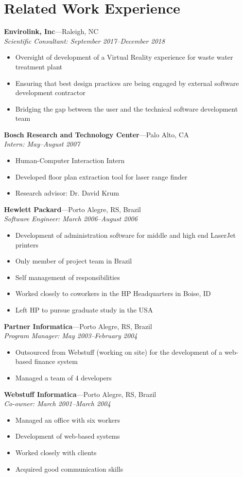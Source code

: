 \documentclass[wideaddress]{vitae}
\let\olditem\item
\def\item{\nopagebreak[4]\olditem}%
\newcommand{\ressubitem}[1]{
	\item \begin{flushleft} #1 \end{flushleft}
}
\newcommand{\resbigitem}[3]{
	\item
	\textbf{#1}---#2 \\
	\textit{#3}
}
\newenvironment{ressubsec}[3]{
	\resbigitem{#1}{#2}{#3}
	\begin{itemize}
}{
	\end{itemize}
}
\begin{document}
\section{Related Work Experience}
\begin{description}
	\begin{ressubsec}{Envirolink, Inc}{Raleigh, NC}{Scientific Consultant: September 2017--December 2018}
		\ressubitem{Oversight of development of a Virtual Reality experience for waste water treatment plant}
		\ressubitem{Ensuring that best design practices are being engaged by external software development contractor}
		\ressubitem{Bridging the gap between the user and the technical software development team}
	\end{ressubsec}

	\begin{ressubsec}{Bosch Research and Technology Center}{Palo Alto, CA}{Intern: May--August 2007}
		\ressubitem{Human-Computer Interaction Intern}
		\ressubitem{Developed floor plan extraction tool for laser range finder}
		\ressubitem{Research advisor: Dr. David Krum}
	\end{ressubsec}

	\begin{ressubsec}{Hewlett Packard}{Porto Alegre, RS, Brazil}{Software Engineer: March 2006--August 2006}
		\ressubitem{Development of administration software for middle and high end LaserJet printers}
		\ressubitem{Only member of project team in Brazil}
		\ressubitem{Self management of responsibilities}
		\ressubitem{Worked closely to coworkers in the HP Headquarters in Boise, ID}
		\ressubitem{Left HP to pursue graduate study in the USA}
	\end{ressubsec}

	\begin{ressubsec}{Partner Informatica}{Porto Alegre, RS, Brazil}{Program Manager: May 2003--February 2004}
		\ressubitem{Outsourced from Webstuff (working on site) for the development of a web-based finance system}
		\ressubitem{Managed a team of 4 developers}
	\end{ressubsec}

	\begin{ressubsec}{Webstuff Informatica}{Porto Alegre, RS, Brazil}{Co-owner: March 2001--March 2004}
		\ressubitem{Managed an office with six workers}
		\ressubitem{Development of web-based systems}
		\ressubitem{Worked closely with clients}
		\ressubitem{Acquired good communication skills}
	\end{ressubsec}
\end{description}
\end{document}

